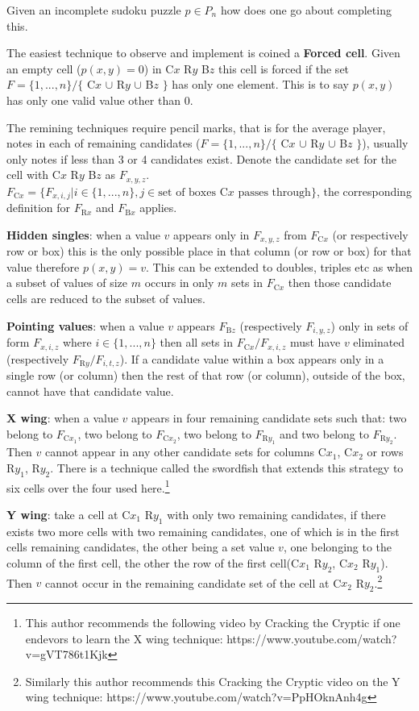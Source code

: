 \documentclass[a4paper,11pt]{report}
\newcounter{row}
\newcounter{col}
\begin{document}
{Given an incomplete sudoku puzzle $p\in P_n$ how does one go about completing this.

The easiest technique to observe and implement is coined a \textbf{Forced cell}. Given an empty cell ($p(x,y)=0$) in C$x$ R$y$ B$z$ this cell is forced if the set $F=\{1,...,n\} / \{$ C$x$ $\cup$ R$y$ $\cup$ B$z$ $\}$ has only one element. This is to say $p(x,y)$ has only one valid value other than 0. 

The remining techniques require pencil marks, that is for the average player, notes in each of remaining candidates ($F=\{1,...,n\} / \{$ C$x$ $\cup$ R$y$ $\cup$ B$z$ $\}$), usually only notes if less than 3 or 4 candidates exist. Denote the candidate set for the cell with C$x$ R$y$ B$z$ as $F_{x,y,z}$. $F_{\text{C}x} = \{F_{x,i,j}|i\in\{1,...,n\}, j \in \text{set of boxes C$x$ passes through}\}$, the corresponding definition for $F_{\text{R}x}$ and $F_{\text{B}x}$ applies.

\textbf{Hidden singles}: when a value $v$ appears only in $F_{x,y,z}$ from $F_{\text{C}x}$ (or respectively row or box) this is the only possible place in that column (or row or box) for that value therefore $p(x,y)=v$. This can be extended to doubles, triples etc as when a subset of values of size $m$ occurs in only $m$ sets in $F_{\text{C}x}$ then those candidate cells are reduced to the subset of values.

\textbf{Pointing values}: when a value $v$ appears $F_{\text{B}z}$ (respectively $F_{i,y,z}$) only in sets of form $F_{x,i,z}$  where $i\in \{1,...,n\}$ then all sets in $F_{\text{C}x}/F_{x,i,z}$ must have $v$ eliminated (respectively $F_{\text{R}y}/F_{i,t,z}$). If a candidate value within a box appears only in a single row (or column) then the rest of that row (or column), outside of the box, cannot have that candidate value.

\textbf{X wing}: when a value $v$ appears in four remaining candidate sets such that: two belong to $F_{\text{C}x_1}$, two belong to $F_{\text{C}x_2}$, two belong to $F_{\text{R}y_1}$ and two belong to $F_{\text{R}y_2}$. Then $v$ cannot appear in any other candidate sets for columns C$x_1$, C$x_2$ or rows R$y_1$, R$y_2$. There is a technique called the swordfish that extends this strategy to six cells over the four used here.\footnote{This author recommends the following video by Cracking the Cryptic if one endevors to learn the X wing technique: https://www.youtube.com/watch?v=gVT786t1Kjk}

\textbf{Y wing}: take a cell at C$x_1$ R$y_1$ with only two remaining candidates, if there exists two more cells with two remaining candidates, one of which is in the first cells remaining candidates, the other being a set value $v$, one belonging to the column of the first cell, the other the row of the first cell(C$x_1$ R$y_2$, C$x_2$ R$y_1$). Then $v$ cannot occur in the remaining candidate set of the cell at C$x_2$ R$y_2$.\footnote{Similarly this author recommends this Cracking the Cryptic video on the Y wing technique: https://www.youtube.com/watch?v=PpHOknAnh4g}

}
\end{document}
